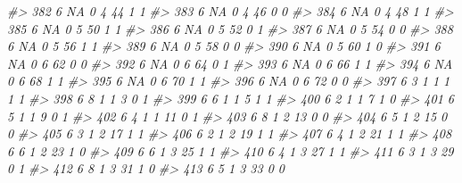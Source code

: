 \documentclass[]{book}
\newenvironment{Shaded}{\begin{snugshade}}{\end{snugshade}}
\newcommand{\CommentTok}[1]{\textcolor[rgb]{0.56,0.35,0.01}{\textit{#1}}}
\begin{document}
\begin{Shaded}
\begin{Highlighting}[]
\CommentTok{#> 382     6        NA         0     4    44           1            1}
\CommentTok{#> 383     6        NA         0     4    46           0            0}
\CommentTok{#> 384     6        NA         0     4    48           1            1}
\CommentTok{#> 385     6        NA         0     5    50           1            1}
\CommentTok{#> 386     6        NA         0     5    52           0            1}
\CommentTok{#> 387     6        NA         0     5    54           0            0}
\CommentTok{#> 388     6        NA         0     5    56           1            1}
\CommentTok{#> 389     6        NA         0     5    58           0            0}
\CommentTok{#> 390     6        NA         0     5    60           1            0}
\CommentTok{#> 391     6        NA         0     6    62           0            0}
\CommentTok{#> 392     6        NA         0     6    64           0            1}
\CommentTok{#> 393     6        NA         0     6    66           1            1}
\CommentTok{#> 394     6        NA         0     6    68           1            1}
\CommentTok{#> 395     6        NA         0     6    70           1            1}
\CommentTok{#> 396     6        NA         0     6    72           0            0}
\CommentTok{#> 397     6         3         1     1     1           1            1}
\CommentTok{#> 398     6         8         1     1     3           0            1}
\CommentTok{#> 399     6         6         1     1     5           1            1}
\CommentTok{#> 400     6         2         1     1     7           1            0}
\CommentTok{#> 401     6         5         1     1     9           0            1}
\CommentTok{#> 402     6         4         1     1    11           0            1}
\CommentTok{#> 403     6         8         1     2    13           0            0}
\CommentTok{#> 404     6         5         1     2    15           0            0}
\CommentTok{#> 405     6         3         1     2    17           1            1}
\CommentTok{#> 406     6         2         1     2    19           1            1}
\CommentTok{#> 407     6         4         1     2    21           1            1}
\CommentTok{#> 408     6         6         1     2    23           1            0}
\CommentTok{#> 409     6         6         1     3    25           1            1}
\CommentTok{#> 410     6         4         1     3    27           1            1}
\CommentTok{#> 411     6         3         1     3    29           0            1}
\CommentTok{#> 412     6         8         1     3    31           1            0}
\CommentTok{#> 413     6         5         1     3    33           0            0}

\end{Highlighting}
\end{Shaded}
\end{document}
